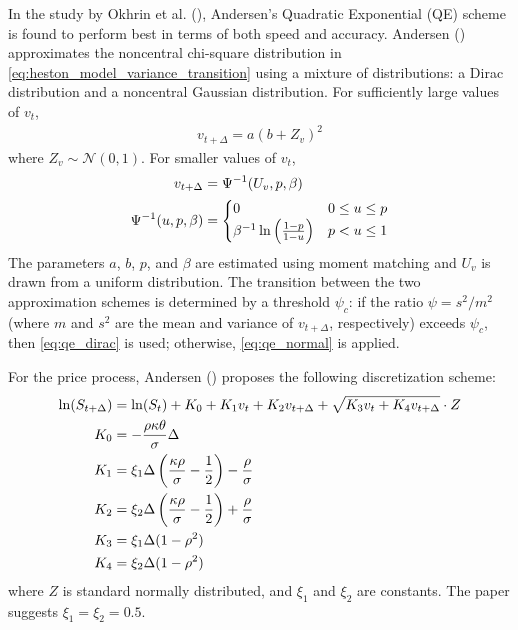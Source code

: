 In the study by Okhrin et al. (\citeyear{okhrinSimulatingCoxIngersoll2022}), Andersen's Quadratic Exponential (QE) scheme is found to perform best in terms of both speed and accuracy. Andersen (\citeyear{andersenEfficientSimulationHeston2007}) approximates the noncentral chi-square distribution in \eqref{eq:heston_model_variance_transition} using a mixture of distributions: a Dirac distribution and a noncentral Gaussian distribution. For sufficiently large values of $v_t$,
\begin{align}
    \label{eq:qe_normal}
    v_{t+\Delta} = a(b+Z_v)^2
\end{align}
where $Z_v \sim \mathcal{N}(0,1)$. For smaller values of $v_t$,
\begin{align}
    \label{eq:qe_dirac}
    v_{t+\Delta} &= \Psi^{-1}(U_v, p, \beta) \\
    \Psi^{-1}(u,p,\beta) &= \begin{cases}
        0 & 0\le u\le p \\
        \beta^{-1}\ln\left(\frac{1-p}{1-u}\right) & p<u\le 1
    \end{cases} \notag
\end{align}
The parameters $a$, $b$, $p$, and $\beta$ are estimated using moment matching and $U_v$ is drawn from a uniform distribution. The transition between the two approximation schemes is determined by a threshold $\psi_c$: if the ratio $\psi = s^2 / m^2$ (where $m$ and $s^2$ are the mean and variance of $v_{t+\Delta}$, respectively) exceeds $\psi_c$, then \eqref{eq:qe_dirac} is used; otherwise, \eqref{eq:qe_normal} is applied.

For the price process, Andersen (\citeyear{andersenEfficientSimulationHeston2007}) proposes the following discretization scheme:
\begin{align}
    \ln(S_{t+\Delta}) &= \ln(S_t) + K_0 + K_1v_t + K_2v_{t+\Delta} + \sqrt{K_3v_t + K_4v_{t+\Delta}}\cdot Z \notag \\
    K_0 &= -\frac{\rho\kappa\theta}{\sigma}\Delta \notag \\
    K_1 &= \xi_1\Delta\left(\frac{\kappa\rho}{\sigma} - \frac{1}{2}\right)-\frac{\rho}{\sigma} \notag \\
    K_2 &= \xi_2\Delta\left(\frac{\kappa\rho}{\sigma}-\frac{1}{2}\right)+\frac{\rho}{\sigma} \notag \\
    K_3 &= \xi_1\Delta(1-\rho^2) \notag \\
    K_4 &= \xi_2\Delta(1-\rho^2) \notag
\end{align}
where $Z$ is standard normally distributed, and $\xi_1$ and $\xi_2$ are constants. The paper suggests $\xi_1 = \xi_2 = 0.5$.

